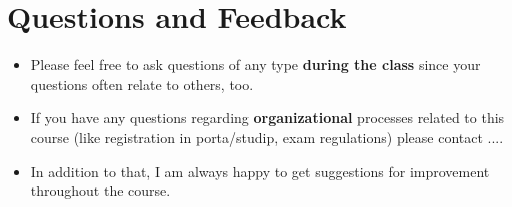 \documentclass{article}
\def\secretary{...}
\begin{document}
\section{Questions and Feedback}
\begin{itemize}
	\item Please feel free to ask questions of any type \textbf{during the class} since your questions often relate to others, too.
	\item If you have any questions regarding \textbf{organizational} processes related to this course (like registration in porta/studip, exam regulations) please contact \secretary.
	\item In addition to that, I am always happy to get suggestions for improvement throughout the course.
\end{itemize}
\end{document}
